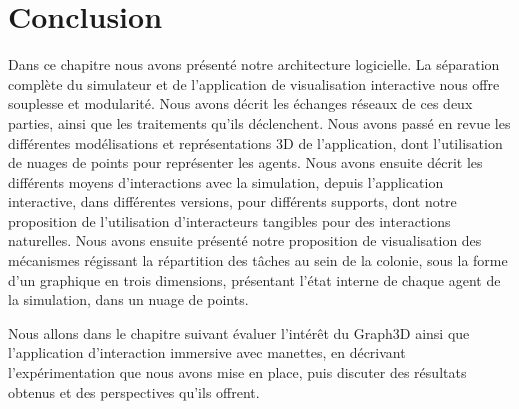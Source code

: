 	
	
			
	\section*{Conclusion}
	Dans ce chapitre nous avons présenté notre architecture logicielle. La séparation complète du simulateur et de l'application de visualisation interactive nous offre souplesse et modularité. Nous avons décrit les échanges réseaux de ces deux parties, ainsi que les traitements qu'ils déclenchent. Nous avons passé en revue les différentes modélisations et représentations 3D de l'application, dont l'utilisation de nuages de points pour représenter les agents. Nous avons ensuite décrit les différents moyens d'interactions avec la simulation, depuis l'application interactive, dans différentes versions, pour différents supports, dont notre proposition de l'utilisation d'interacteurs tangibles pour des interactions naturelles.
	Nous avons ensuite présenté notre proposition de visualisation des mécanismes régissant la répartition des tâches au sein de la colonie, sous la forme d'un graphique en trois dimensions, présentant l'état interne de chaque agent de la simulation, dans un nuage de points.
	
	 Nous allons dans le chapitre suivant évaluer l'intérêt du Graph3D ainsi que l'application d'interaction immersive avec manettes, en décrivant l'expérimentation que nous avons mise en place, puis discuter des résultats obtenus et des perspectives qu'ils offrent.
	